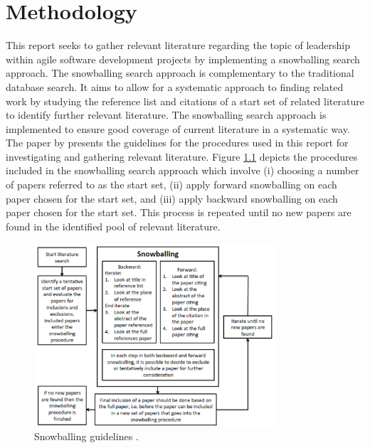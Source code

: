 \chapter{Methodology}

This report seeks to gather relevant literature regarding the topic of leadership within agile software development projects by implementing a snowballing search approach. The snowballing search approach is complementary to the traditional database search. It aims to allow for a systematic approach to finding related work by studying the reference list and citations of a start set of related literature to identify further relevant literature. The snowballing search approach is implemented to ensure good coverage of current literature in a systematic way.\\

The paper by \cite{Wohlin:2014:GSS:2601248.2601268} presents the guidelines for the procedures used in this report for investigating and gathering relevant literature. Figure \ref{snow} depicts the procedures included in the snowballing search approach which involve (i) choosing a number of papers referred to as the start set, (ii) apply forward snowballing on each paper chosen for the start set, and (iii) apply backward snowballing on each paper chosen for the start set. This process is repeated until no new papers are found in the identified pool of relevant literature.\\

\begin{figure}[ht]
\centering
     \includegraphics[width=0.8\textwidth]{./fig/snowballing.png}
      \caption{Snowballing guidelines \cite{Wohlin}.}
       \label{snow}
\end{figure}

